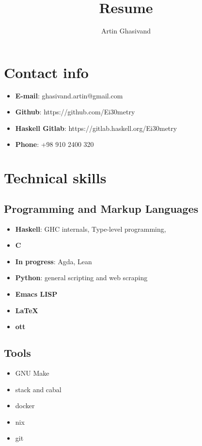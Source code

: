 \documentclass{article}
\renewcommand{\maketitle}{
  \begin{center} \huge{\theauthor}

    \vspace{.25em}

  \end{center} }
\begin{document}
\title{Resume} \author{Artin Ghasivand}
\maketitle

\section{Contact info}
\begin{itemize}
\item \textbf{E-mail}: ghasivand.artin@gmail.com
\item \textbf{Github}: https://github.com/Ei30metry
\item \textbf{Haskell Gitlab}: https://gitlab.haskell.org/Ei30metry
\item \textbf{Phone}: +98 910 2400 320

\end{itemize}

\newpage

\section{Technical skills}

\subsection{Programming and Markup Languages}

\begin{itemize}
\item \textbf{Haskell}: GHC internals, Type-level programming,
\item \textbf{C}
\item \textbf{In progress}: Agda, Lean
\item \textbf{Python}: general scripting and web scraping
\item \textbf{Emacs LISP}
\item \textbf{\LaTeX}
\item \textbf{ott}
\end{itemize}

\subsection{Tools}

\begin{itemize}
\item GNU Make
\item stack and cabal
\item docker
\item nix
\item git
\end{itemize}
\end{document}
